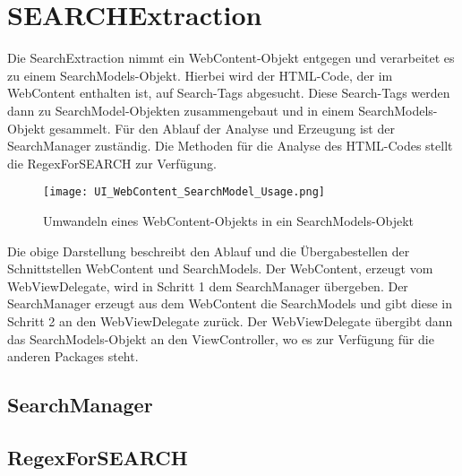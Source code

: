 
\section{SEARCHExtraction}
Die SearchExtraction nimmt ein WebContent-Objekt entgegen und verarbeitet es zu einem SearchModels-Objekt. Hierbei wird der HTML-Code, der im WebContent enthalten ist, auf Search-Tags abgesucht. Diese Search-Tags werden dann zu SearchModel-Objekten zusammengebaut und in einem SearchModels-Objekt gesammelt.\newline
Für den Ablauf der Analyse und Erzeugung ist der SearchManager zuständig. Die Methoden für die Analyse des HTML-Codes stellt die RegexForSEARCH zur Verfügung.

\begin{figure}[h]
	\centering
	\texttt{[image: UI\_WebContent\_SearchModel\_Usage.png]}
	\caption{Umwandeln eines WebContent-Objekts in ein SearchModels-Objekt}
	\label{fig:WebContent zu SearchModels}
\end{figure}

Die obige Darstellung beschreibt den Ablauf und die Übergabestellen der Schnittstellen WebContent und SearchModels. Der WebContent, erzeugt vom WebViewDelegate, wird in Schritt 1 dem SearchManager übergeben. Der SearchManager erzeugt aus dem WebContent die SearchModels und gibt diese in Schritt 2 an den WebViewDelegate zurück. Der WebViewDelegate übergibt dann das SearchModels-Objekt an den ViewController, wo es zur Verfügung für die anderen Packages steht.

\subsection{SearchManager}
\subsection{RegexForSEARCH}

